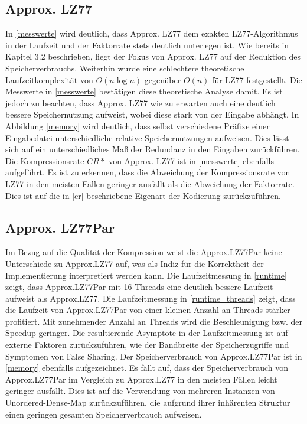 \subsection{Approx. LZ77}
In \ref{messwerte} wird deutlich, dass Approx. LZ77 dem exakten LZ77-Algorithmus in der Laufzeit und der Faktorrate stets deutlich unterlegen ist. Wie bereits in Kapitel
3.2 beschrieben, liegt der Fokus von Approx. LZ77 auf der Reduktion des Speicherverbrauchs. Weiterhin wurde eine schlechtere theoretische Laufzeitkomplexität von
$O(n\log n)$ gegenüber $O(n)$ für LZ77 festgestellt. Die Messwerte in \ref{messwerte} bestätigen diese theoretische Analyse damit. Es ist jedoch zu beachten, dass
Approx. LZ77 wie zu erwarten auch eine deutlich bessere Speichernutzung aufweist, wobei diese stark von der Eingabe abhängt. In Abbildung \ref{memory} wird deutlich, dass
selbst verschiedene Präfixe einer Eingabedatei unterschiedliche relative Speichernutzungen aufweisen. Dies lässt sich auf ein unterschiedliches Maß der Redundanz in den
Eingaben zurückführen. Die Kompressionsrate $CR*$ von Approx. LZ77 ist in \ref{messwerte} ebenfalls aufgeführt. Es ist zu erkennen, dass die Abweichung der Kompressionsrate
von LZ77 in den meisten Fällen geringer ausfällt als die Abweichung der Faktorrate. Dies ist auf die in \ref{cr} beschriebene Eigenart der Kodierung zurückzuführen.

\subsection{Approx. LZ77Par}
Im Bezug auf die Qualität der Kompression weist die Approx.LZ77Par keine Unterschiede zu Approx.LZ77 auf, was als Indiz für die Korrektheit der Implementierung
interpretiert werden kann. Die Laufzeitmessung in \ref{runtime} zeigt, dass Approx.LZ77Par mit 16 Threads eine deutlich bessere Laufzeit aufweist als Approx.LZ77.
Die Laufzeitmessung in \ref{runtime_threads} zeigt, dass die Laufzeit von Approx.LZ77Par von einer kleinen Anzahl an Threads stärker profitiert. Mit zunehmender 
Anzahl an Threads wird die Beschleunigung bzw. der Speedup geringer. Die resultierende Asymptote in der Laufzeitmessung ist auf externe Faktoren zurückzuführen,
wie der Bandbreite der Speicherzugriffe und Symptomen von False Sharing. Der Speicherverbrauch von Approx.LZ77Par ist in \ref{memory} ebenfalls aufgezeichnet.
Es fällt auf, dass der Speicherverbrauch von Approx.LZ77Par im Vergleich zu Approx.LZ77 in den meisten Fällen leicht geringer ausfällt. 
Dies ist auf die Verwendung von mehreren Instanzen von Unordered-Dense-Map zurückzuführen, die aufgrund ihrer inhärenten Struktur einen geringen gesamten
Speicherverbrauch aufweisen. 